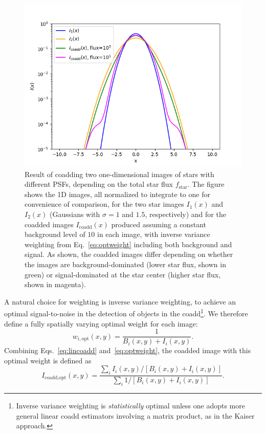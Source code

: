 \documentclass[modern]{style_and_logos/lsstdescnote}
\begin{document}
\begin{figure}
\begin{center}
\includegraphics[width=5.5in]{figures/coadd_psf.png}
 \caption{Result of coadding two one-dimensional images of stars with different PSFs, depending on the total star flux $f_\text{star}$.  The figure shows the 1D images, all normalized to integrate to one for convenience of comparison, for the two star images $I_1(x)$ and $I_2(x)$ (Gaussians with $\sigma=1$ and $1.5$, respectively) and for the coadded images $I_\text{coadd}(x)$ produced assuming a constant background level of $10$ in each image, with inverse variance weighting from Eq.~\eqref{eq:optweight} including both background and signal.  As shown, the coadded images differ depending on whether the images are background-dominated (lower star flux, shown in green) or signal-dominated at the star center (higher star flux, shown in magenta).   } \label{fig:coadd_psf}
\end{center}
 \end{figure}
 
A natural choice for weighting is inverse variance weighting, to achieve an optimal signal-to-noise in the detection of objects in the coadd\footnote{Inverse variance weighting is {\em statistically} optimal unless one adopts more general linear coadd estimators involving a matrix product, as in the Kaiser approach.}.  We therefore define a fully spatially varying optimal weight for each image:
\begin{equation}\label{eq:optweight}
    w_{i,\text{opt}}(x,y) = \frac{1}{B_i(x,y)+I_i(x,y)}.
\end{equation}
Combining Eqs.~\eqref{eq:lincoadd} and~\eqref{eq:optweight}, the coadded image with this optimal weight is defined as
\begin{equation}\label{eq:optcoadd}
    I_\text{coadd,opt}(x,y) = \frac{\sum_i I_i(x,y)/\left[B_i(x,y)+I_i(x,y)\right]}{\sum_i 1/\left[B_i(x,y)+I_i(x,y)\right]}.
\end{equation}
\end{document}
